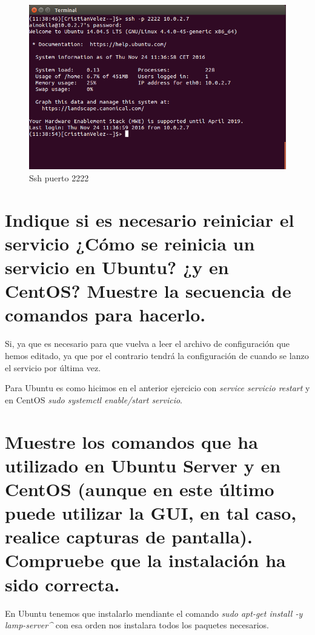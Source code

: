 	\begin{figure}[H]
	\centering
	\includegraphics[scale=0.35]{pics/ssh_port_2222.png}  
	\caption{Ssh puerto 2222} \label{fig:ssh_conect}
	\end{figure}
\section[Cuestión 8]{ Indique si es necesario reiniciar el servicio ¿Cómo se reinicia	un servicio en Ubuntu? ¿y en CentOS? Muestre la secuencia de comandos para hacerlo.}

Si, ya que es necesario para que vuelva a leer el archivo de configuración que hemos editado, ya que por el contrario tendrá la configuración de cuando se lanzo el servicio por última vez.

Para Ubuntu es como hicimos en el anterior ejercicio con \textit{service servicio restart} y en CentOS  \textit{sudo systemctl enable/start servicio}.


\section[Cuestión 9]{ Muestre los comandos que ha utilizado en Ubuntu Server y en	CentOS (aunque en este último puede utilizar la GUI, en tal caso, realice	capturas de pantalla). Compruebe que la instalación ha sido correcta.}

En Ubuntu tenemos que instalarlo mendiante el comando \textit{sudo apt-get install -y lamp-server\^} con esa orden nos instalara todos los paquetes necesarios.\\


